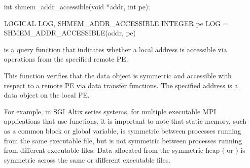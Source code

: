\synC
int shmem_addr_accessible(void *addr, int pe);

\synF
LOGICAL LOG, SHMEM_ADDR_ACCESSIBLE
INTEGER pe
LOG = SHMEM_ADDR_ACCESSIBLE(addr, pe)


{
         is  a  query  function  that indicates whether a
       local address is accessible via \openshmem operations  from the  specified
       remote \ac{PE}.
       
       This function verifies that the data object is symmetric and accessible
       with respect to a remote \ac{PE} via \openshmem  data  transfer  functions.   The
       specified address  is a data object on the local \ac{PE}.

       For example, in  SGI Altix series systems, for multiple executable MPI applications
       that use \openshmem functions, it is important to note that  static  memory,
       such  as a  \Fortran{}  common  block  or \Clang{} global variable, is symmetric
       between processes running from the same executable  file,  but  is  not
       symmetric  between  processes  running from different executable files.
       Data allocated from  the symmetric  heap  ( or	)  is
       symmetric across the same or different executable files.
}
{
}
\eAPI
